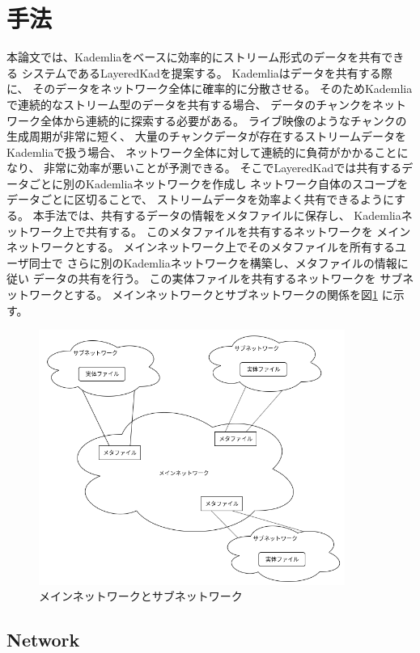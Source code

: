 \documentclass[sotsuron]{jcsie}
\begin{document}
\section{手法}
本論文では、Kademliaをベースに効率的にストリーム形式のデータを共有できる
システムであるLayeredKadを提案する。
Kademliaはデータを共有する際に、
そのデータをネットワーク全体に確率的に分散させる。
そのためKademliaで連続的なストリーム型のデータを共有する場合、
データのチャンクをネットワーク全体から連続的に探索する必要がある。
ライブ映像のようなチャンクの生成周期が非常に短く、
大量のチャンクデータが存在するストリームデータを
Kademliaで扱う場合、
ネットワーク全体に対して連続的に負荷がかかることになり、
非常に効率が悪いことが予測できる。
そこでLayeredKadでは共有するデータごとに別のKademliaネットワークを作成し
ネットワーク自体のスコープをデータごとに区切ることで、
ストリームデータを効率よく共有できるようにする。
本手法では、共有するデータの情報をメタファイルに保存し、
Kademliaネットワーク上で共有する。
このメタファイルを共有するネットワークを
メインネットワークとする。
メインネットワーク上でそのメタファイルを所有するユーザ同士で
さらに別のKademliaネットワークを構築し、メタファイルの情報に従い
データの共有を行う。
この実体ファイルを共有するネットワークを
サブネットワークとする。
メインネットワークとサブネットワークの関係を図\ref{fig:image}
に示す。

\begin{figure}[H]
	\centering
	\includegraphics[width=10cm]{./assets/image/image.png}
	\caption{メインネットワークとサブネットワーク}
	\label{fig:image}
\end{figure}

\subsection{Network}
\end{document}

